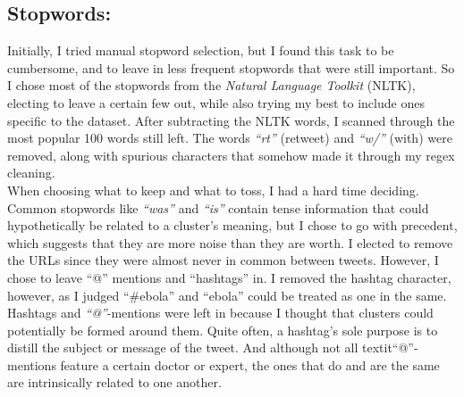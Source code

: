 \documentclass[fleqn]{article}
\begin{document}
\subsection{Stopwords:}
Initially, I tried manual stopword selection, but I found this task to be cumbersome, and to leave in less frequent stopwords that were still important.  So I chose most of the stopwords from the \textit{Natural Language Toolkit }(NLTK), electing to leave a certain few out, while also trying my best to include ones specific to the dataset.  After subtracting the NLTK words, I scanned through the most popular 100 words still left.  The words \textit{``rt''} (retweet) and \textit{``w/''} (with) were removed, along with spurious characters that somehow made it through my regex cleaning.\\
\newline
When choosing what to keep and what to toss, I had a hard time deciding.  Common stopwords like \textit{``was''} and \textit{``is''} contain tense information that could hypothetically be related to a cluster's meaning, but I chose to go with precedent, which suggests that they are more noise than they are worth.  I elected to remove the URLs since they were almost never in common between tweets.  However, I chose to leave ``@'' mentions and ``hashtags'' in.  I removed the hashtag character, however, as I judged ``\#ebola'' and ``ebola'' could be treated as one in the same. Hashtags and \textit{``@''}-mentions were left in because I thought that clusters could potentially be formed around them.  Quite often, a hashtag's sole purpose is to distill the subject or message of the tweet.  And although not all textit{``@''}-mentions feature a certain doctor or expert, the ones that do and are the same are intrinsically related to one another.
\end{document}
